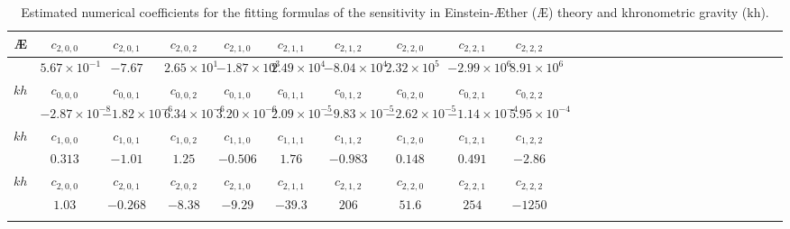 \documentclass[prd,aps,twocolumn,nofootinbib,showpacs,superscriptaddress]{revtex4-1}
\begin{document}
{\begin{table}
\begin{centering}
\begin{tabular}{cccccccccccccccccccccccccccc}
\noalign{\smallskip}
\AE & \multicolumn{1}{c}{$c_{2,0,0}$} 
& \multicolumn{1}{c}{$c_{2,0,1}$} 
& \multicolumn{1}{c}{$c_{2,0,2}$} 
& \multicolumn{1}{c}{$c_{2,1,0}$}
& \multicolumn{1}{c}{$c_{2,1,1}$} 
& \multicolumn{1}{c}{$c_{2,1,2}$} 
& \multicolumn{1}{c}{$c_{2,2,0}$} 
& \multicolumn{1}{c}{$c_{2,2,1}$} 
& \multicolumn{1}{c}{$c_{2,2,2}$}
\\
\hline
& $5.67 \times 10^{-1}$ & 
$-7.67$ & 
$2.65 \times 10^1$ & 
$-1.87 \times 10^3$ & 
$2.49 \times 10^4$ & 
$-8.04 \times 10^4$ & 
$2.32 \times 10^5$ & 
$-2.99 \times 10^6$ & 
$8.91 \times 10^6$ \\
\hline
\hline
\noalign{\smallskip}
$kh$ & \multicolumn{1}{c}{$c_{0,0,0}$} 
& \multicolumn{1}{c}{$c_{0,0,1}$} 
& \multicolumn{1}{c}{$c_{0,0,2}$} 
& \multicolumn{1}{c}{$c_{0,1,0}$}
& \multicolumn{1}{c}{$c_{0,1,1}$} 
& \multicolumn{1}{c}{$c_{0,1,2}$} 
& \multicolumn{1}{c}{$c_{0,2,0}$} 
& \multicolumn{1}{c}{$c_{0,2,1}$} 
& \multicolumn{1}{c}{$c_{0,2,2}$} \\
\hline
& 
$-2.87\times 10^{-8}$ &
$-1.82\times 10^{-6}$ & 
$6.34 \times 10^{-6}$ & 
$3.20 \times 10^{-6}$ & 
$2.09 \times 10^{-5}$ &
$-9.83 \times 10^{-5}$ & 
$-2.62 \times 10^{-5}$ & 
$-1.14\times 10^{-4}$ & 
$5.95 \times 10^{-4}$ \\
\noalign{\smallskip}
$kh$ & \multicolumn{1}{c}{$c_{1,0,0}$} 
& \multicolumn{1}{c}{$c_{1,0,1}$} 
& \multicolumn{1}{c}{$c_{1,0,2}$} 
& \multicolumn{1}{c}{$c_{1,1,0}$}
& \multicolumn{1}{c}{$c_{1,1,1}$} 
& \multicolumn{1}{c}{$c_{1,1,2}$} 
& \multicolumn{1}{c}{$c_{1,2,0}$} 
& \multicolumn{1}{c}{$c_{1,2,1}$} 
& \multicolumn{1}{c}{$c_{1,2,2}$} \\
\hline
& 
$ 0.313$ &
$-1.01$ & 
$ 1.25$ & 
$-0.506$ & 
$1.76$ &
$-0.983$ & 
$ 0.148$ & 
$ 0.491$ & 
$-2.86$ \\
%
\noalign{\smallskip}
$kh$ & \multicolumn{1}{c}{$c_{2,0,0}$} 
& \multicolumn{1}{c}{$c_{2,0,1}$} 
& \multicolumn{1}{c}{$c_{2,0,2}$} 
& \multicolumn{1}{c}{$c_{2,1,0}$}
& \multicolumn{1}{c}{$c_{2,1,1}$} 
& \multicolumn{1}{c}{$c_{2,1,2}$} 
& \multicolumn{1}{c}{$c_{2,2,0}$} 
& \multicolumn{1}{c}{$c_{2,2,1}$} 
& \multicolumn{1}{c}{$c_{2,2,2}$} \\
\hline
& 
$1.03$ & 
$-0.268$ & 
$-8.38$ & 
$-9.29$ & 
$-39.3$ &
$206$ & 
$51.6$ &  
$254$ & 
$-1250$ \\
\noalign{\smallskip}
\hline
\hline
\end{tabular}
\end{centering}
\caption{\label{fitting-table} Estimated numerical coefficients for the fitting formulas of the sensitivity in Einstein-\AE ther (\AE) theory and khronometric gravity (kh).}
\end{table}
}
\end{document}
